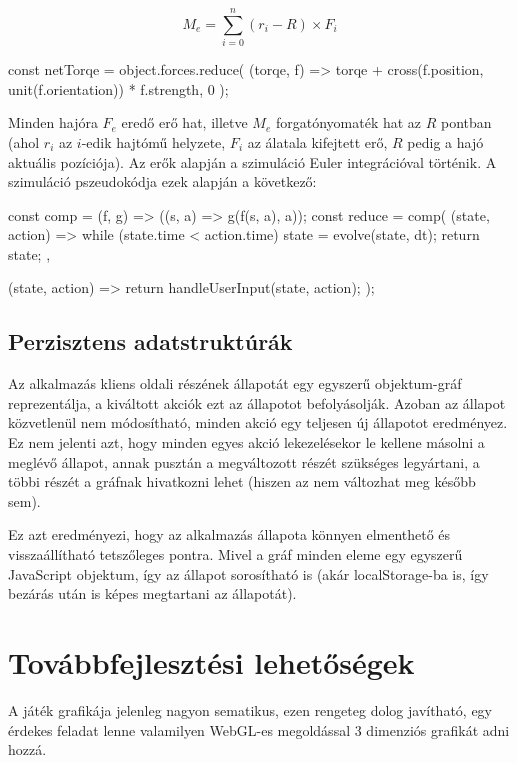 \documentclass[11pt]{article}
\begin{document}
\[
  M_e = \sum_{i=0}^n(r_i - R) \times F_i
\]

\begin{js}
  const netTorqe = object.forces.reduce(
    (torqe, f) => torqe + cross(f.position, unit(f.orientation)) * f.strength,
    0
  );
\end{js}

Minden hajóra $F_e$ eredő erő hat, illetve $M_e$ forgatónyomaték hat az $R$ pontban
(ahol $r_i$ az $i$-edik hajtómű helyzete, $F_i$ az álatala kifejtett erő, $R$ pedig a hajó aktuális pozíciója).
Az erők alapján a szimuláció Euler integrációval történik.
A szimuláció pszeudokódja ezek alapján a következő:

\begin{js}
  const comp = (f, g) => ((s, a) => g(f(s, a), a));
  const reduce = comp(
    (state, action) => {
      while (state.time < action.time) {
        state = evolve(state, dt);
      }
      return state;
    },

    (state, action) => {
      return handleUserInput(state, action);
    }
  );
\end{js}

\subsection{Perzisztens adatstruktúrák}

Az alkalmazás kliens oldali részének állapotát egy egyszerű objektum-gráf
reprezentálja, a kiváltott akciók ezt az állapotot befolyásolják.
Azoban az állapot közvetlenül nem módosítható, minden akció egy teljesen
új állapotot eredményez. Ez nem jelenti azt, hogy minden egyes akció lekezelésekor
le kellene másolni a meglévő állapot, annak pusztán a megváltozott részét szükséges
legyártani, a többi részét a gráfnak hivatkozni lehet (hiszen az nem változhat meg később sem).

Ez azt eredményezi, hogy az alkalmazás állapota könnyen elmenthető és visszaállítható
tetszőleges pontra. Mivel a gráf minden eleme egy egyszerű JavaScript objektum,
így az állapot sorosítható is (akár localStorage-ba is, így bezárás után is képes megtartani az állapotát).

\section{Továbbfejlesztési lehetőségek}

A játék grafikája jelenleg nagyon sematikus, ezen rengeteg dolog javítható,
egy érdekes feladat lenne valamilyen WebGL-es megoldással 3 dimenziós grafikát
adni hozzá.
\end{document}
